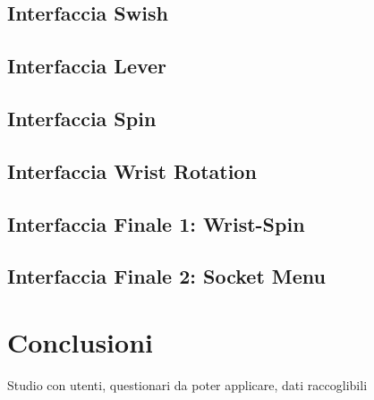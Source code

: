 \documentclass[target=bach,aauheader=]{thud}
\begin{document}
\section{Interfaccia Swish} %


\section{Interfaccia Lever}

\section{Interfaccia Spin} %



\section{Interfaccia Wrist Rotation} %

\section{Interfaccia Finale 1: Wrist-Spin} %
\label{int_wrist-spin}


\section{Interfaccia Finale 2: Socket Menu} %
\label{int_socket}

\chapter{Conclusioni} %
Studio con utenti, questionari da poter applicare, dati raccoglibili


\backmatter
\end{document}
